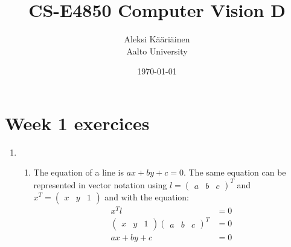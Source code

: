 \documentclass[11pt,a4paper]{article}
\title{CS-E4850 Computer Vision D}
\author{Aleksi Kääriäinen  \\
	Aalto University  \\
	}
\begin{document}
\date{\today}

\maketitle

\newpage

\section*{Week 1 exercices}

\begin{enumerate}
      \item

            \begin{enumerate}

                  \item The equation of a line is $ax + by + c = 0$. The same equation can be represented in vector notation using $l = \begin{pmatrix}
                                    a & b & c
                              \end{pmatrix}^T$ and $x^T = \begin{pmatrix}
                                    x & y & 1
                              \end{pmatrix}$ and with the equation:
                        \begin{align*}
                              x^T l                         & = 0 \\
                              \begin{pmatrix}
                                    x & y & 1
                              \end{pmatrix} \begin{pmatrix}
                                                  a & b & c
                                            \end{pmatrix}^T & = 0 \\
                              ax + by + c                   & = 0
                        \end{align*}


\end{enumerate}
\end{enumerate}
\end{document}
